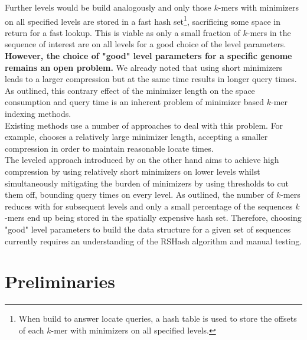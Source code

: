 \documentclass[a4paper,titlepage,onecolumn,oneside,12pt,nenglish,titlepage=firstiscover]{scrbook}
\theoremstyle{plain} %
\theoremstyle{definition} %
\theoremstyle{remark} %
\theoremstyle{plain}
\newcommand{\minimizerLength}{m}
\begin{document}
Further levels would be build analogously and only those $k$-mers with \frequent minimizers on all specified levels are stored in a fast hash set\footnote{When build to answer locate queries, a hash table is used to store the offsets of each $k$-mer with \frequent minimizers on all specified levels.}, sacrificing some space in return for a fast lookup. This is viable as only a small fraction of $k$-mers in the sequence of interest are \frequent on all levels for a good choice of the level parameters.\\

\textbf{However, the choice of "good" level parameters for a specific genome remains an open problem.} We already noted that using short minimizers leads to a larger compression but at the same time results in longer query times. As outlined, this contrary effect of the minimizer length on the space consumption and query time is an inherent problem of minimizer based $k$-mer indexing methods.\\
Existing methods use a number of approaches to deal with this problem. For example, \citet{pibiri_sparse_2022} chooses a relatively large minimizer length, accepting a smaller compression in order to maintain reasonable locate times.\\
The leveled approach introduced by \citet{schulte-mattler_rshash_2026} on the other hand aims to achieve high compression by using relatively short minimizers on lower levels whilst simultaneously mitigating the burden of \frequent minimizers by using thresholds to cut them off, bounding query times on every level. As outlined, the number of $k$-mers reduces with for subsequent levels and only a small percentage of the sequences $k$-mers end up being stored in the spatially expensive hash set. Therefore, choosing "good" level parameters to build the data structure for a given set of sequences currently requires an understanding of the RSHash algorithm and manual testing.

\chapter{Preliminaries}\label{chap:notation}
\newcommand{\numberOfLevels}{{L}}
\newcommand{\setOfLevels}{\mathcal{L}}

\newcommand{\levelParameters}[1]{p^{#1}}
\newcommand{\varLevelParameters}[1]{\textbf{p}^{#1}}
\newcommand{\parameterAccess}[3]{\levelParameters{#1}[#2^{#3}]}

\newcommand{\frequencyOf}[1]{freq(#1)}
\newcommand{\minimizerOf}[2]{min^{\hashfunction{#2}}_{\minimizerLength^{#2}}(#1)}
\end{document}
